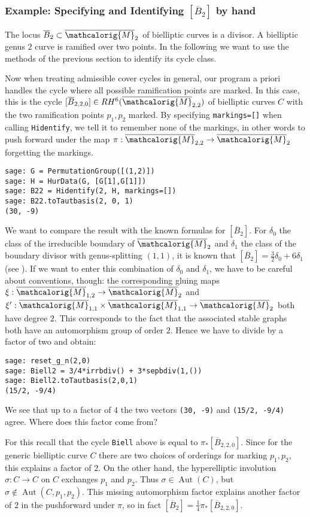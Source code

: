 \documentclass[11pt]{article}
\newcommand{\M}{\ensuremath{\overline{\mathcalorig{M}}}}
\begin{document}
\subsubsection{Example: Specifying and Identifying \texorpdfstring{$[\overline B_2]$}{[B 2]} by hand} \label{Sect:B2}
The locus $\overline B_2 \subset \M_{2}$ of bielliptic curves is a divisor. A bielliptic genus $2$ curve is ramified over two points. In the following we want to use the methods of the previous section to identify its cycle class.

Now when treating admissible cover cycles in general, our program a priori handles the cycle where all possible ramification points are marked. In this case, this is the cycle $[\overline B_{2,2,0}] \in RH^6(\M_{2,2})$ of bielliptic curves $C$ with the two ramification points $p_1, p_2$ marked. By specifying \verb|markings=[]| when calling \verb|Hidentify|, we tell it to remember none of the markings, in other words to push forward under the map $\pi: \M_{2,2} \to \M_2$ forgetting the markings.
\begin{lstlisting}
sage: G = PermutationGroup([(1,2)])
sage: H = HurData(G, [G[1],G[1]])
sage: B22 = Hidentify(2, H, markings=[])
sage: B22.toTautbasis(2, 0, 1)
(30, -9)
\end{lstlisting}
We want to compare the result with the known formulas for $[\overline B_2]$. For $\delta_0$ the class of the irreducible boundary of $\M_2$ and $\delta_1$ the class of the boundary divisor with genus-splitting $(1,1)$, it is known that $[\overline B_2]=\frac{3}{2} \delta_0 + 6 \delta_1$ (see \cite{faberbiell}). If we want to enter this combination of $\delta_0$ and $\delta_1$, we have to be careful about conventions, though: the corresponding gluing maps $\xi: \M_{1,2} \to \M_{2}$ and $\xi':\M_{1,1} \times \M_{1,1} \to \M_2$ both have degree $2$. This corresponds to the fact that the associated stable graphs both have an automorphism group of order $2$. Hence we have to divide by a factor of two and obtain:
\begin{lstlisting}
sage: reset_g_n(2,0)
sage: Biell2 = 3/4*irrbdiv() + 3*sepbdiv(1,())
sage: Biell2.toTautbasis(2,0,1)
(15/2, -9/4)
\end{lstlisting}
We see that up to a factor of $4$ the two vectors \verb|(30, -9)| and \verb|(15/2, -9/4)| agree. Where does this factor come from?

For this recall that the cycle \verb|Biell| above is equal to $\pi_* [\overline B_{2,2,0}]$. Since for the generic bielliptic curve $C$ there are two choices of orderings for marking $p_1, p_2$, this explains a factor of $2$. On the other hand, the hyperelliptic involution $\sigma: C \to C$ on $C$ exchanges $p_1$ and $p_2$. Thus $\sigma \in \operatorname{Aut}(C)$, but $\sigma \notin \operatorname{Aut}(C,p_1,p_2)$. This missing automorphism factor explains another factor of $2$ in the pushforward under $\pi$, so in fact $[\overline B_2] = \frac{1}{4} \pi_* [\overline B_{2,2,0}]$.
\end{document}
